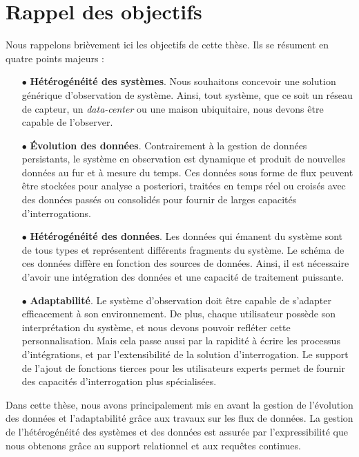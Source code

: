 \section{Rappel des objectifs}\label{sec:conclusion:objectifs}
Nous rappelons brièvement ici les objectifs de cette thèse. Ils se résument en quatre points majeurs :
\begin{itemize}
	\item[$\bullet$] \textbf{Hétérogénéité des systèmes}. Nous souhaitons concevoir une solution générique d'observation de système. Ainsi, tout système, que ce soit un réseau de capteur, un \textit{data-center} ou une maison ubiquitaire, nous devons être capable de l'observer.
	\item[$\bullet$] \textbf{Évolution des données}. Contrairement à la gestion de données persistants, le système en observation est dynamique et produit de nouvelles données au fur et à mesure du temps. Ces données sous forme de flux peuvent être stockées pour analyse a posteriori, traitées en temps réel ou croisés avec des données passés ou consolidés pour fournir de larges capacités d'interrogations.
	\item[$\bullet$] \textbf{Hétérogénéité des données}. Les données qui émanent du système sont de tous types et représentent différents fragments du système. Le schéma de ces données diffère en fonction des sources de données. Ainsi, il est nécessaire d'avoir une intégration des données et une capacité de traitement puissante.
	\item[$\bullet$] \textbf{Adaptabilité}. Le système d'observation doit être capable de s'adapter efficacement à son environnement. De plus, chaque utilisateur possède son interprétation du système, et nous devons pouvoir refléter cette personnalisation. Mais cela passe aussi par la rapidité à écrire les processus d'intégrations, et par l'extensibilité de la solution d'interrogation. Le support de l'ajout de fonctions tierces pour les utilisateurs experts permet de fournir des capacités d'interrogation plus spécialisées.
\end{itemize}

Dans cette thèse, nous avons principalement mis en avant la gestion de l'évolution des données et l'adaptabilité grâce aux travaux sur les flux de données. La gestion de l'hétérogénéité des systèmes et des données est assurée par l'expressibilité que nous obtenons grâce au support relationnel et aux requêtes continues.
